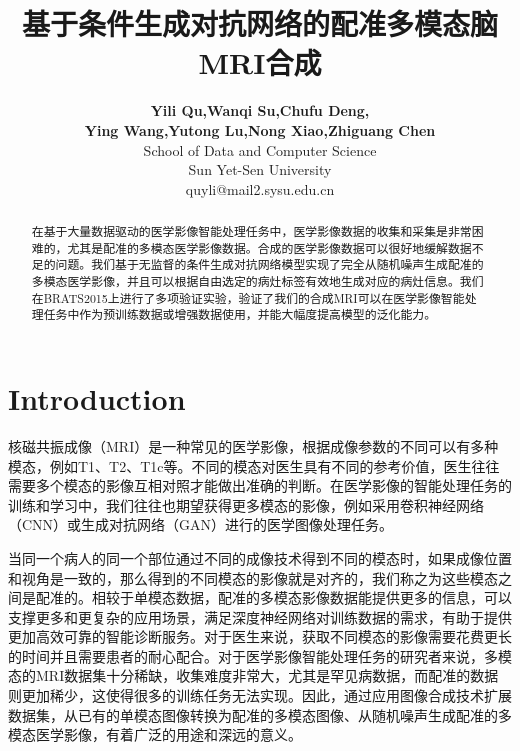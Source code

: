 \documentclass[letterpaper]{article} %
\title{基于条件生成对抗网络的配准多模态脑MRI合成}
\author{\Large \textbf{Yili Qu,Wanqi Su,Chufu Deng,}\\ \Large \textbf{Ying Wang,Yutong Lu,Nong Xiao,Zhiguang Chen}\\  %
School of Data and Computer Science\\ Sun Yet-Sen University\\	
quyli@mail2.sysu.edu.cn%
}
\begin{document}
\maketitle

\begin{abstract}
在基于大量数据驱动的医学影像智能处理任务中，医学影像数据的收集和采集是非常困难的，尤其是配准的多模态医学影像数据。合成的医学影像数据可以很好地缓解数据不足的问题。我们基于无监督的条件生成对抗网络模型实现了完全从随机噪声生成配准的多模态医学影像，并且可以根据自由选定的病灶标签有效地生成对应的病灶信息。我们在BRATS2015上进行了多项验证实验，验证了我们的合成MRI可以在医学影像智能处理任务中作为预训练数据或增强数据使用，并能大幅度提高模型的泛化能力。
\end{abstract}
	
\section{Introduction}
核磁共振成像（MRI）是一种常见的医学影像，根据成像参数的不同可以有多种模态，例如T1、T2、T1c等。不同的模态对医生具有不同的参考价值，医生往往需要多个模态的影像互相对照才能做出准确的判断。在医学影像的智能处理任务的训练和学习中，我们往往也期望获得更多模态的影像，例如采用卷积神经网络（CNN）\cite{86krizhevsky2012imagenet}或生成对抗网络（GAN）\cite{25goodfellow2014generative}进行的医学图像处理任务。

当同一个病人的同一个部位通过不同的成像技术得到不同的模态时，如果成像位置和视角是一致的，那么得到的不同模态的影像就是对齐的，我们称之为这些模态之间是配准的。相较于单模态数据，配准的多模态影像数据能提供更多的信息，可以支撑更多和更复杂的应用场景，满足深度神经网络对训练数据的需求，有助于提供更加高效可靠的智能诊断服务。对于医生来说，获取不同模态的影像需要花费更长的时间并且需要患者的耐心配合。对于医学影像智能处理任务的研究者来说，多模态的MRI数据集十分稀缺，收集难度非常大，尤其是罕见病数据，而配准的数据则更加稀少，这使得很多的训练任务无法实现。因此，通过应用图像合成技术扩展数据集，从已有的单模态图像转换为配准的多模态图像、从随机噪声生成配准的多模态医学影像，有着广泛的用途和深远的意义。
\end{document}
